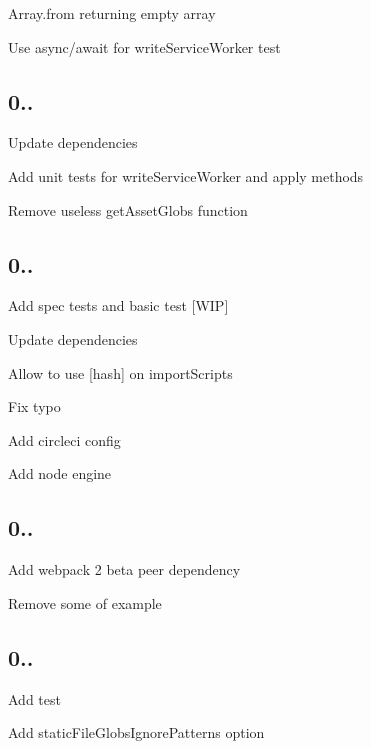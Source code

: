 \begin{DoxyItemize}
\item Array.\+from returning empty array
\item Use async/await for write\+Service\+Worker test
\end{DoxyItemize}

\subsection*{0..}


\begin{DoxyItemize}
\item Update dependencies
\item Add unit tests for write\+Service\+Worker and apply methods
\item Remove useless get\+Asset\+Globs function
\end{DoxyItemize}

\subsection*{0..}


\begin{DoxyItemize}
\item Add spec tests and basic test \mbox{[}W\+IP\mbox{]}
\item Update dependencies
\item Allow to use \mbox{[}hash\mbox{]} on import\+Scripts
\item Fix typo
\item Add circleci config
\item Add node engine
\end{DoxyItemize}

\subsection*{0..}


\begin{DoxyItemize}
\item Add webpack 2 beta peer dependency
\item Remove some of example
\end{DoxyItemize}

\subsection*{0..}


\begin{DoxyItemize}
\item Add test
\item Add {\ttfamily static\+File\+Globs\+Ignore\+Patterns} option
\end{DoxyItemize}

